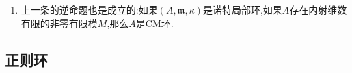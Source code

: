 \begin{enumerate}
\begin{proof}
    	取$A$的极大正则序列$\{x_1,\cdots,x_d\in\mathfrak{m}\}$,按照CM条件这也是参数系统,记$B=A/(x_1,\cdots,x_d)A$,那么$B$是有限长度的.记$E=E_A(\kappa)$.那么$M=B'=\mathrm{Hom}_A(B,E)$也是有限长度的,特别的它是有限生成的.我们就断言$M$的内射维数$\le d$.考虑Koszul复形$K_{\bullet}(x_1,\cdots,x_d)$是$A$模$B$的自由预解.作用正合函子$\mathrm{Hom}_A(-,E)$(因为$E$是内射模)后仍然是正合的,它是$M$的一个长度$d$的内射预解,所以$\mathrm{inj.dim}(M)\le d$.
    \end{proof}
    \item 上一条的逆命题也是成立的:如果$(A,\mathfrak{m},\kappa)$是诺特局部环,如果$A$存在内射维数有限的非零有限模$M$,那么$A$是CM环.
\end{enumerate}
\newpage
\subsection{正则环}

